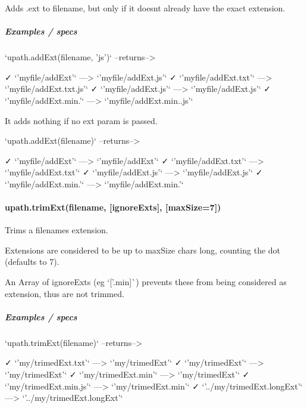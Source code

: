 Adds {\ttfamily .ext} to {\ttfamily filename}, but only if it doesn\textquotesingle{}t already have the exact extension.

\subparagraph*{Examples / specs}

\begin{DoxyVerb}`upath.addExt(filename, 'js')`     --returns-->

    ✓ `'myfile/addExt'`           --->           `'myfile/addExt.js'`
    ✓ `'myfile/addExt.txt'`       --->       `'myfile/addExt.txt.js'`
    ✓ `'myfile/addExt.js'`        --->           `'myfile/addExt.js'`
    ✓ `'myfile/addExt.min.'`      --->      `'myfile/addExt.min..js'`
\end{DoxyVerb}


It adds nothing if no {\ttfamily ext} param is passed. \begin{DoxyVerb}`upath.addExt(filename)`           --returns-->

      ✓ `'myfile/addExt'`           --->              `'myfile/addExt'`
      ✓ `'myfile/addExt.txt'`       --->          `'myfile/addExt.txt'`
      ✓ `'myfile/addExt.js'`        --->           `'myfile/addExt.js'`
      ✓ `'myfile/addExt.min.'`      --->         `'myfile/addExt.min.'`
\end{DoxyVerb}


\paragraph*{{\ttfamily upath.\+trim\+Ext(filename, \mbox{[}ignore\+Exts\mbox{]}, \mbox{[}max\+Size=7\mbox{]})}}

Trims a filename\textquotesingle{}s extension.


\begin{DoxyItemize}
\item Extensions are considered to be up to {\ttfamily max\+Size} chars long, counting the dot (defaults to 7).
\item An {\ttfamily Array} of {\ttfamily ignore\+Exts} (eg `\mbox{[}'.min\textquotesingle{}\mbox{]}\`{}) prevents these from being considered as extension, thus are not trimmed.
\end{DoxyItemize}

\subparagraph*{Examples / specs}

\begin{DoxyVerb}`upath.trimExt(filename)`          --returns-->

    ✓ `'my/trimedExt.txt'`             --->                 `'my/trimedExt'`
    ✓ `'my/trimedExt'`                 --->                 `'my/trimedExt'`
    ✓ `'my/trimedExt.min'`             --->                 `'my/trimedExt'`
    ✓ `'my/trimedExt.min.js'`          --->             `'my/trimedExt.min'`
    ✓ `'../my/trimedExt.longExt'`      --->      `'../my/trimedExt.longExt'`
\end{DoxyVerb}


